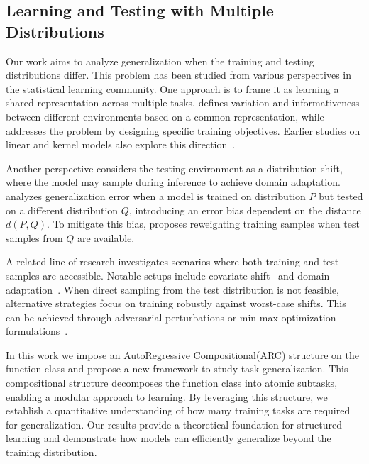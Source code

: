 \subsection{Learning and Testing with Multiple Distributions}



Our work aims to analyze generalization when the training and testing distributions differ. This problem has been studied from various perspectives in the statistical learning community. One approach is to frame it as learning a shared representation across multiple tasks. \cite{ye2021towards} defines variation and informativeness between different environments based on a common representation, while \cite{arjovsky2019invariant} addresses the problem by designing specific training objectives. Earlier studies on linear and kernel models also explore this direction~\citep{du2017hypothesis, lei2021near}.

Another perspective considers the testing environment as a distribution shift, where the model may sample during inference to achieve domain adaptation. \cite{mansour2009domain} analyzes generalization error when a model is trained on distribution \( P \) but tested on a different distribution \( Q \), introducing an error bias dependent on the distance \( d(P,Q) \). To mitigate this bias, \cite{cortes2010learning} proposes reweighting training samples when test samples from \( Q \) are available.  

A related line of research investigates scenarios where both training and test samples are accessible. Notable setups include covariate shift~\citep{kpotufe2021marginal, ma2023optimally} and domain adaptation~\citep{sugiyama2007covariate, ben2014domain}. When direct sampling from the test distribution is not feasible, alternative strategies focus on training robustly against worst-case shifts. This can be achieved through adversarial perturbations or min-max optimization formulations~\citep{madry2017towards, raghunathan2020understanding, duchi2023distributionally}.



In this work we impose an AutoRegressive Compositional(ARC) structure on the function class and propose a new framework to study task generalization. This compositional structure decomposes the function class into atomic subtasks, enabling a modular approach to learning. By leveraging this structure, we establish a quantitative understanding of how many training tasks are required for generalization. Our results provide a theoretical foundation for structured learning and demonstrate how models can efficiently generalize beyond the training distribution.















